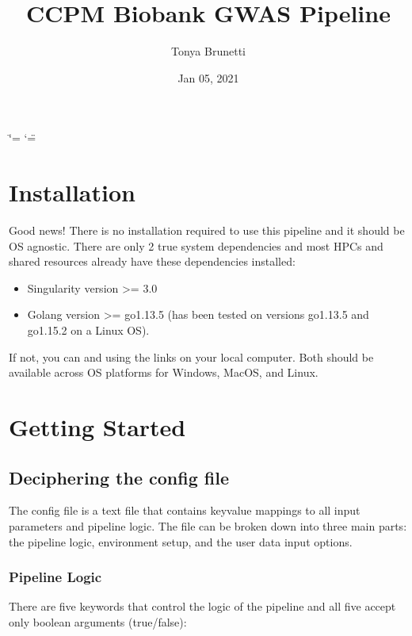 \documentclass[letterpaper,10pt,english]{sphinxmanual}
\title{CCPM Biobank GWAS Pipeline}
\date{Jan 05, 2021}
\author{Tonya Brunetti}
\begin{document}
\ifdefined\shorthandoff
  \ifnum\catcode`\=\string=\active\shorthandoff{=}\fi
  \ifnum\catcode`\"=\active{}\fi
\fi

\pagestyle{empty}
\sphinxmaketitle
\pagestyle{plain}
\sphinxtableofcontents
\pagestyle{normal}
\label{\detokenize{index::doc}}



\chapter{Installation}
\label{\detokenize{index:installation}}
Good news!  There is no installation required to use this pipeline and it should be OS agnostic.  There are only 2 true system dependencies and most HPCs and shared resources already have these dependencies installed:
\begin{itemize}
\item {} 
Singularity version \textgreater{}= 3.0

\item {} 
Golang version \textgreater{}= go1.13.5 (has been tested on versions go1.13.5 and go1.15.2 on a Linux OS).

\end{itemize}

If not, you can  and  using the links on your local computer.  Both should be available across OS platforms for Windows, MacOS, and Linux.


\chapter{Getting Started}
\label{\detokenize{index:getting-started}}

\section{Deciphering the config file}
\label{\detokenize{decipheringConfig:deciphering-the-config-file}}\label{\detokenize{decipheringConfig::doc}}
The config file is a text file that contains key\sphinxhyphen{}value mappings to all input parameters and pipeline logic. The file can be broken down into three main parts: the pipeline logic, environment setup, and the user data input options.


\subsection{Pipeline Logic}
\label{\detokenize{decipheringConfig:pipeline-logic}}
There are five keywords that control the logic of the pipeline and all five accept only boolean arguments (true/false):
\end{document}

